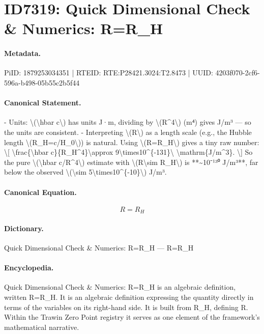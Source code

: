 \section*{ID7319: Quick Dimensional Check \& Numerics: R=R\_H}
\paragraph{Metadata.}
PiID: 1879253034351 | RTEID: RTE:P28421.3024:T2.8473 | UUID: 4203f070-2cf6-596a-b498-05b55c2b5f44

\paragraph{Canonical Statement.}
- Units: \textbackslash{}(\textbackslash{}hbar c\textbackslash{}) has units J·m, dividing by \textbackslash{}(R\textasciicircum{}4\textbackslash{}) (m⁴) gives J/m³ — so the units are consistent. - Interpreting \textbackslash{}(R\textbackslash{}) as a length scale (e.g., the Hubble length \textbackslash{}(R\_H=c/H\_0\textbackslash{})) is natural. Using \textbackslash{}(R=R\_H\textbackslash{}) gives a tiny raw number: \textbackslash{}[ \textbackslash{}frac\{\textbackslash{}hbar c\}\{R\_H\textasciicircum{}4\}\textbackslash{}approx 9\textbackslash{}times10\textasciicircum{}\{-131\}\textbackslash{} \textbackslash{}mathrm\{J/m\textasciicircum{}3\}. \textbackslash{}] So the pure \textbackslash{}(\textbackslash{}hbar c/R\textasciicircum{}4\textbackslash{}) estimate with \textbackslash{}(R\textbackslash{}sim R\_H\textbackslash{}) is **\textasciitilde{}10⁻¹³⁰ J/m³**, far below the observed \textbackslash{}(\textbackslash{}sim 5\textbackslash{}times10\textasciicircum{}\{-10\}\textbackslash{}) J/m³.

\paragraph{Canonical Equation.}
\[
R=R_H
\]

\paragraph{Dictionary.}
Quick Dimensional Check \& Numerics: R=R\_H — R=R\_H

\paragraph{Encyclopedia.}
Quick Dimensional Check \& Numerics: R=R\_H is an algebraic definition, written R=R\_H. It is an algebraic definition expressing the quantity directly in terms of the variables on its right-hand side. It is built from R\_H, defining R. Within the Trawin Zero Point registry it serves as one element of the framework's mathematical narrative.
